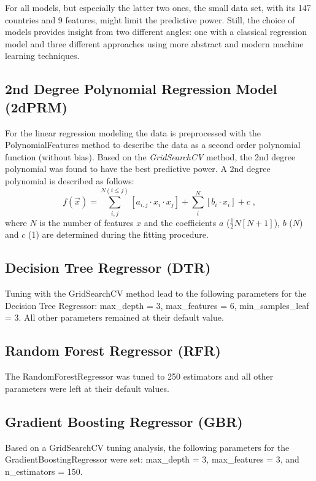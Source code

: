 \documentclass[a4paper, 11pt]{article} %
\begin{document}
For all models, but especially the latter two ones, the small data set, with its 147 countries and 9 features, might limit the predictive power. Still, the choice of models provides insight from two different angles: one with a classical regression model and three different approaches using more abstract and modern machine learning techniques.

\subsection{2nd Degree Polynomial Regression Model (2dPRM)}
For the linear regression modeling the data is preprocessed with the PolynomialFeatures method to describe the data as a second order polynomial function (without bias). Based on the \textit{GridSearchCV} method, the 2nd degree polynomial was found to have the best predictive power. A 2nd degree polynomial is described as follows:
\begin{equation}
f(\vec{x}) = \sum_{i,j}^{N(i\leq j)} [a_{i,j}\cdot x_i \cdot x_j] + \sum_{i}^{N} [b_i \cdot x_i ]+ c \; ,
\label{eq:Poly}
\end{equation}
where $N$ is the number of features $x$ and the coefficients $a$ ($\frac{1}{2}N[N+1]$), $b$ ($N$) and $c$ (1) are determined during the fitting procedure.

\subsection{Decision Tree Regressor (DTR)}
Tuning with the GridSearchCV method lead to the following parameters for the Decision Tree Regressor: max\_depth = 3, max\_features = 6, min\_samples\_leaf = 3. All other parameters remained at their default value.

\subsection{Random Forest Regressor (RFR)}
The RandomForestRegressor was tuned to 250 estimators and all other parameters were left at their default values.

\subsection{Gradient Boosting Regressor (GBR)}
Based on a GridSearchCV tuning analysis, the following parameters for the GradientBoostingRegressor were set: max\_depth = 3, max\_features = 3, and n\_estimators = 150.
\end{document}
